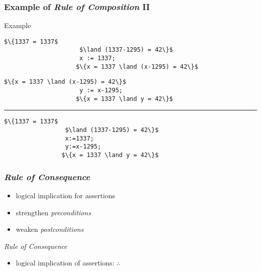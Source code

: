 \documentclass{beamer}
\begin{document}
		\begin{frame}[fragile]
		\frametitle{Example of \emph{Rule of Composition} II}
		\begin{exampleblock}{Example}
			\begin{minipage}[t]{0.51\textwidth}
				\begin{lstlisting}[mathescape]
					$\{1337 = 1337$
					 $\land (1337-1295) = 42\}$
					 x := 1337;
					$\{x = 1337 \land (x-1295) = 42\}$
				\end{lstlisting}
			\end{minipage}\noindent
			\hfill
			\vline
			\hfill
			\begin{minipage}[t]{0.48\textwidth}
				\begin{lstlisting}[mathescape]
					$\{x = 1337 \land (x-1295) = 42\}$
					 y := x-1295;
					$\{x = 1337 \land y = 42\}$
				\end{lstlisting}
			\end{minipage}
			\rule{\textwidth}{1pt}
			\begin{minipage}{0.28\textwidth}
				\hfill
			\end{minipage}\noindent
			\begin{minipage}{0.3\textwidth}
			\begin{lstlisting}[mathescape]
				$\{1337 = 1337$
				 $\land (1337-1295) = 42\}$
				 x:=1337;
				 y:=x-1295;
				$\{x = 1337 \land y = 42\}$
			\end{lstlisting}
			\end{minipage}
		\end{exampleblock}
		\end{frame}

		\begin{frame}
		\frametitle{\emph{Rule of Consequence}}

		\begin{itemize}
			\item logical implication for assertions
			\item strengthen \emph{preconditions}
			\item weaken \emph{postconditions}
		\end{itemize}
		\begin{block}{\emph{Rule of Consequence}}
			\begin{prooftree}
			\end{prooftree}
			\begin{itemize}
				\item logical implication of assertions: $\therefore$
			\end{itemize}
		\end{block}

		\end{frame}
\end{document}
